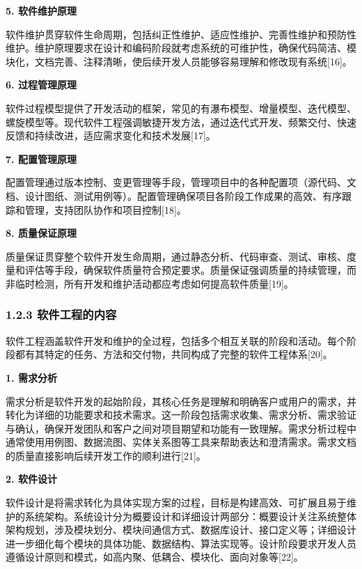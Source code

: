 \textbf{5. 软件维护原理}

软件维护贯穿软件生命周期，包括纠正性维护、适应性维护、完善性维护和预防性维护。维护原理要求在设计和编码阶段就考虑系统的可维护性，确保代码简洁、模块化，文档完善、注释清晰，使后续开发人员能够容易理解和修改现有系统{[}16{]}。

\textbf{6. 过程管理原理}

软件过程模型提供了开发活动的框架，常见的有瀑布模型、增量模型、迭代模型、螺旋模型等。现代软件工程强调敏捷开发方法，通过迭代式开发、频繁交付、快速反馈和持续改进，适应需求变化和技术发展{[}17{]}。

\textbf{7. 配置管理原理}

配置管理通过版本控制、变更管理等手段，管理项目中的各种配置项（源代码、文档、设计图纸、测试用例等）。配置管理确保项目各阶段工作成果的高效、有序跟踪和管理，支持团队协作和项目控制{[}18{]}。

\textbf{8. 质量保证原理}

质量保证贯穿整个软件开发生命周期，通过静态分析、代码审查、测试、审核、度量和评估等手段，确保软件质量符合预定要求。质量保证强调质量的持续管理，而非临时检测，所有开发和维护活动都应考虑如何提高软件质量{[}19{]}。

\subsubsection{1.2.3 软件工程的内容}\label{ux8f6fux4ef6ux5de5ux7a0bux7684ux5185ux5bb9}

软件工程涵盖软件开发和维护的全过程，包括多个相互关联的阶段和活动。每个阶段都有其特定的任务、方法和交付物，共同构成了完整的软件工程体系{[}20{]}。

\textbf{1. 需求分析}

需求分析是软件开发的起始阶段，其核心任务是理解和明确客户或用户的需求，并转化为详细的功能要求和技术需求。这一阶段包括需求收集、需求分析、需求验证与确认，确保开发团队和客户之间对项目期望和功能有一致理解。需求分析过程中通常使用用例图、数据流图、实体关系图等工具来帮助表达和澄清需求。需求文档的质量直接影响后续开发工作的顺利进行{[}21{]}。

\textbf{2. 软件设计}

软件设计是将需求转化为具体实现方案的过程，目标是构建高效、可扩展且易于维护的系统架构。系统设计分为概要设计和详细设计两部分：概要设计关注系统整体架构规划，涉及模块划分、模块间通信方式、数据库设计、接口定义等；详细设计进一步细化每个模块的具体功能、数据结构、算法实现等。设计阶段要求开发人员遵循设计原则和模式，如高内聚、低耦合、模块化、面向对象等{[}22{]}。

